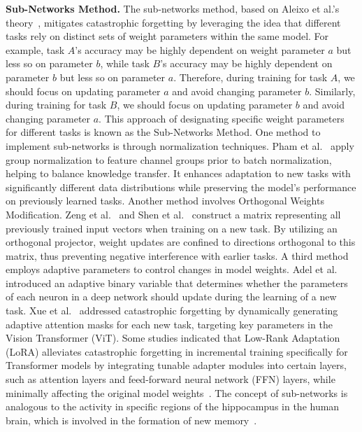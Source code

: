 \documentclass[journal,hideappendix]{vgtc}
\newenvironment{j_itemize}{
\begin{itemize}[]
  \setlength{\itemsep}{3pt}
  \setlength{\parskip}{0pt}
  \setlength{\parsep}{0pt}
}{\end{itemize}}
\begin{document}
\begin{j_itemize}
    \item[$\bullet$] \textbf{Sub-Networks Method.} The sub-networks method, based on Aleixo et al.'s theory~\cite{aleixo2023catastrophic}, mitigates catastrophic forgetting by leveraging the idea that different tasks rely on distinct sets of weight parameters within the same model. For example, task $A$'s accuracy may be highly dependent on weight parameter $a$ but less so on parameter $b$, while task $B$'s accuracy may be highly dependent on parameter $b$ but less so on parameter $a$. Therefore, during training for task $A$, we should focus on updating parameter $a$ and avoid changing parameter $b$. Similarly, during training for task $B$, we should focus on updating parameter $b$ and avoid changing parameter $a$. This approach of designating specific weight parameters for different tasks is known as the Sub-Networks Method. 
    One method to implement sub-networks is through normalization techniques. Pham et al.~\cite{pham2022continual} apply group normalization to feature channel groups prior to batch normalization, helping to balance knowledge transfer. It enhances adaptation to new tasks with significantly different data distributions while preserving the model’s performance on previously learned tasks. Another method involves Orthogonal Weights Modification. Zeng et al.~\cite{zeng2019continual} and Shen et al.~\cite{shen2021generative} construct a matrix representing all previously trained input vectors when training on a new task. By utilizing an orthogonal projector, weight updates are confined to directions orthogonal to this matrix, thus preventing negative interference with earlier tasks. A third method employs adaptive parameters to control changes in model weights. Adel et al.~\cite{Adel2020Continual} introduced an adaptive binary variable that determines whether the parameters of each neuron in a deep network should update during the learning of a new task. Xue et al.~\cite{xue2022meta} addressed catastrophic forgetting by dynamically generating adaptive attention masks for each new task, targeting key parameters in the Vision Transformer (ViT). Some studies indicated that Low-Rank Adaptation (LoRA) alleviates catastrophic forgetting in incremental training specifically for Transformer models by integrating tunable adapter modules into certain layers, such as attention layers and feed-forward neural network (FFN) layers, while minimally affecting the original model weights~\cite{hu2021lora,kalajdzievski2024scaling,ren2024analyzing}. The concept of sub-networks is analogous to the activity in specific regions of the hippocampus in the human brain, which is involved in the formation of new memory~\cite{lavenex2000hippocampal,rolls2006spatial, meira2018hippocampal}.


\end{j_itemize}
\end{document}
